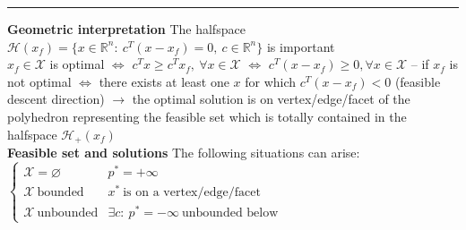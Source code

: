\documentclass[a4paper]{article}
\begin{document}
\vspace{-0.3cm}
\hrule
\noindent
\textbf{Geometric interpretation} The halfspace $\mathcal{H}(x_f)=\{x\in\mathbb{R}^n: \ c^T(x-x_f)=0, \ c\in\mathbb{R}^n\}$ is important\\
$x_f\in\mathcal{X}$ is optimal $\iff$ $c^T{x}\ge c^T{x_f}, \ \forall{x}\in\mathcal{X}$ $\iff$
$c^T(x-x_f)\ge0 , \forall{x}\in\mathcal{X}$ -- 
if $x_f$ is not optimal $\iff$ there exists at least one $x$ for which $c^T{(x-x_f)}<0$ (feasible descent direction) $\to$ the optimal solution is on vertex/edge/facet of the polyhedron representing the feasible set which is totally contained in the halfspace $\mathcal{H}_{+}(x_f)$\\
\textbf{Feasible set and solutions} The following situations can arise: $\begin{cases}
    \mathcal{X}=\varnothing& p^*=+\infty\\
    \mathcal{X} \ \text{bounded}& x^*\  \text{is on a vertex/edge/facet }\\
    \mathcal{X} \ \text{unbounded}&\exists{c}: \ p^*=-\infty \ \text{unbounded below}
\end{cases}$
\end{document}
